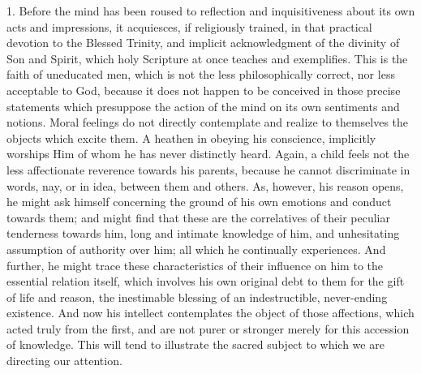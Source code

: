 1. Before the mind has been roused to reflection and
inquisitiveness about its own acts and impressions, it acquiesces, if
religiously trained, in that practical devotion to the Blessed
Trinity, and implicit acknowledgment of the divinity of Son and
Spirit, which holy Scripture at once teaches and exemplifies. This is
the faith of uneducated men, which is not the less philosophically
correct, nor less acceptable to God, because it does not happen to be
conceived in those precise statements which presuppose the action of
the mind on its own sentiments and notions. Moral feelings do not
directly contemplate and realize to themselves the objects which
excite them. A heathen in obeying his conscience, implicitly worships
Him of whom he has never distinctly heard. Again, a child feels
not the less affectionate reverence towards his parents, because he
cannot discriminate in words, nay, or in idea, between them and
others. As, however, his reason opens, he might ask himself concerning
the ground of his own emotions and conduct towards them; and might
find that these are the correlatives of their peculiar tenderness
towards him, long and intimate knowledge of him, and unhesitating
assumption of authority over him; all which he continually
experiences. And further, he might trace these characteristics of
their influence on him to the essential relation itself, which
involves his own original debt to them for the gift of life and
reason, the inestimable blessing of an indestructible, never-ending
existence. And now his intellect contemplates the object of those
affections, which acted truly from the first, and are not purer or
stronger merely for this accession of knowledge. This will tend to
illustrate the sacred subject to which we are directing our attention.

